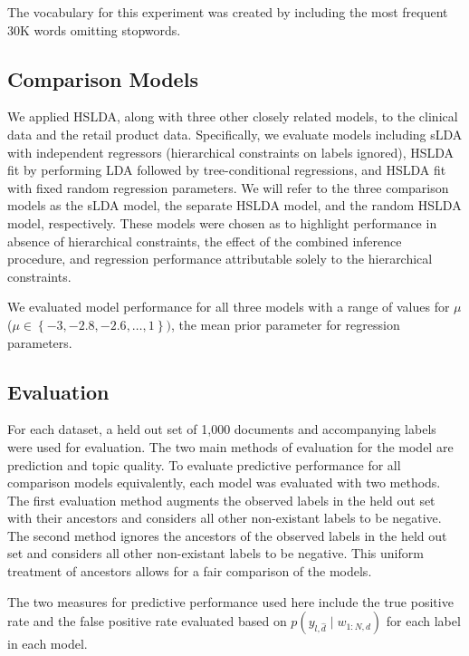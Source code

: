 The vocabulary for this experiment was created by including the most
frequent 30K words omitting stopwords.


\subsection{Comparison Models}

We applied HSLDA, along with three other closely related models, to
the clinical data and the retail product data. Specifically, we evaluate
models including sLDA with independent regressors (hierarchical constraints
on labels ignored), HSLDA fit by performing LDA followed by tree-conditional
regressions, and HSLDA fit with fixed random regression parameters.
We will refer to the three comparison models as the sLDA model, the
separate HSLDA model, and the random HSLDA model, respectively. These
models were chosen as to highlight performance in absence of hierarchical
constraints, the effect of the combined inference procedure, and regression
performance attributable solely to the hierarchical constraints.

We evaluated model performance for all three models with a range of
values for $\mu$ ($\mu\in\left\{ -3,-2.8,-2.6,\ldots,1\right\} )$,
the mean prior parameter for regression parameters.


\subsection{Evaluation}

For each dataset, a held out set of 1,000 documents and accompanying
labels were used for evaluation. The two main methods of evaluation
for the model are prediction and topic quality. To evaluate predictive
performance for all comparison models equivalently, each model was
evaluated with two methods. The first evaluation method augments the
observed labels in the held out set with their ancestors and considers
all other non-existant labels to be negative. The second method ignores
the ancestors of the observed labels in the held out set and considers
all other non-existant labels to be negative. This uniform treatment
of ancestors allows for a fair comparison of the models.

The two measures for predictive performance used here include the
true positive rate and the false positive rate evaluated based on
$p\left(y_{l,\hat{d}}\mid w_{1:N,d}\right)$ for each label in each
model.
